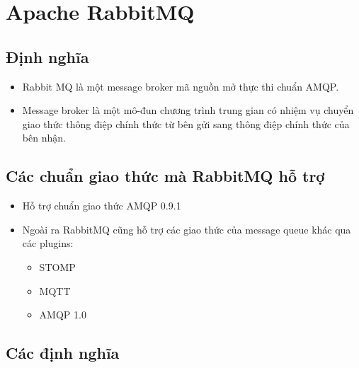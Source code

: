 \section{Apache RabbitMQ}
\subsection{Định nghĩa}
\begin{itemize}
 \item Rabbit MQ là một message broker mã nguồn mở thực thi chuẩn AMQP. 
 \item Message broker là một mô-đun chương trình trung gian có nhiệm vụ chuyển giao thức thông điệp chính thức từ bên gửi sang thông điệp chính thức của bên nhận.
\end{itemize}

\subsection{Các chuẩn giao thức mà RabbitMQ hỗ trợ}
\begin{itemize}
	\item Hỗ trợ chuẩn giao thức AMQP 0.9.1
	\item Ngoài ra RabbitMQ cũng hỗ trợ các giao thức của message queue khác qua các plugins:
	\begin{itemize}
		\item STOMP
		\item MQTT
		\item AMQP 1.0
	\end{itemize}
\end{itemize}

\subsection{Các định nghĩa}
